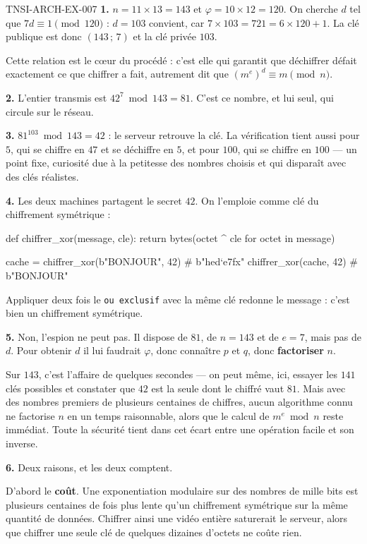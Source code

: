 \begin{corrige}{TNSI-ARCH-EX-007}
\textbf{1.} $n=11\times 13=143$ et $\varphi=10\times 12=120$. On cherche $d$ tel
que $7d\equiv 1\pmod{120}$ : $d=103$ convient, car $7\times 103=721=6\times
120+1$. La clé publique est donc $(143\,;\,7)$ et la clé privée $103$.

Cette relation est le c\oe{}ur du procédé : c'est elle qui garantit que déchiffrer
défait exactement ce que chiffrer a fait, autrement dit que
$(m^e)^d\equiv m \pmod n$.

\textbf{2.} L'entier transmis est $42^7 \bmod 143 = 81$. C'est ce nombre, et lui
seul, qui circule sur le réseau.

\textbf{3.} $81^{103}\bmod 143 = 42$ : le serveur retrouve la clé. La
vérification tient aussi pour $5$, qui se chiffre en $47$ et se déchiffre en $5$,
et pour $100$, qui se chiffre en $100$ — un point fixe, curiosité due à la
petitesse des nombres choisis et qui disparaît avec des clés réalistes.

\textbf{4.} Les deux machines partagent le secret $42$. On l'emploie comme clé du
chiffrement symétrique :
\begin{python}
def chiffrer_xor(message, cle):
    return bytes(octet ^ cle for octet in message)

cache = chiffrer_xor(b"BONJOUR", 42)   # b"hed`e\x7fx"
chiffrer_xor(cache, 42)                # b"BONJOUR"
\end{python}
Appliquer deux fois le \lstinline{ou exclusif} avec la même clé redonne le
message : c'est bien un chiffrement symétrique.

\textbf{5.} Non, l'espion ne peut pas. Il dispose de $81$, de $n=143$ et de
$e=7$, mais pas de $d$. Pour obtenir $d$ il lui faudrait $\varphi$, donc
connaître $p$ et $q$, donc \textbf{factoriser} $n$.

Sur $143$, c'est l'affaire de quelques secondes — on peut même, ici, essayer les
$141$ clés possibles et constater que $42$ est la seule dont le chiffré vaut
$81$. Mais avec des nombres premiers de plusieurs centaines de chiffres, aucun
algorithme connu ne factorise $n$ en un temps raisonnable, alors que le calcul
de $m^e \bmod n$ reste immédiat. Toute la sécurité tient dans cet écart entre une
opération facile et son inverse.

\textbf{6.} Deux raisons, et les deux comptent.

D'abord le \textbf{coût}. Une exponentiation modulaire sur des nombres de mille
bits est plusieurs centaines de fois plus lente qu'un chiffrement symétrique sur
la même quantité de données. Chiffrer ainsi une vidéo entière saturerait le
serveur, alors que chiffrer une seule clé de quelques dizaines d'octets ne coûte
rien.


\end{corrige}
